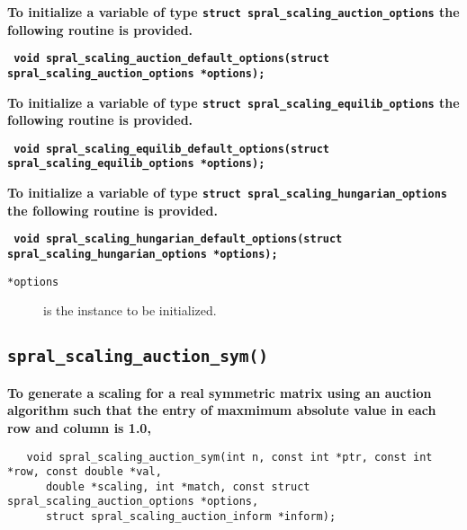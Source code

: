 \textbf{To initialize a variable of type
   \texttt{struct spral\_scaling\_auction\_options} the following routine
   is provided.}

\vspace*{0.1cm}
\noindent
\textbf{\texttt{
   \hspace*{0.3cm} void spral\_scaling\_auction\_default\_options(struct spral\_scaling\_auction\_options *options);
}}

\noindent
\textbf{To initialize a variable of type
   \texttt{struct spral\_scaling\_equilib\_options} the following routine
   is provided.}

\vspace*{0.1cm}
\noindent
\textbf{\texttt{
   \hspace*{0.3cm} void spral\_scaling\_equilib\_default\_options(struct spral\_scaling\_equilib\_options *options);
}}

\noindent
\textbf{To initialize a variable of type
   \texttt{struct spral\_scaling\_hungarian\_options} the following routine
   is provided.}

\vspace*{0.1cm}
\noindent
\textbf{\texttt{
   \hspace*{0.3cm} void spral\_scaling\_hungarian\_default\_options(struct spral\_scaling\_hungarian\_options *options);
}}

\noindent
\begin{description}
   \item[\texttt{*options}] is the instance to be initialized.
\end{description}


\subsection{\texttt{spral\_scaling\_auction\_sym()}}

\textbf{\noindent
   To generate a scaling for a real symmetric matrix using an auction algorithm such that the entry of maxmimum absolute value in each row and column is 1.0,
}
\vspace*{-0.1cm}
\begin{verbatim}
   void spral_scaling_auction_sym(int n, const int *ptr, const int *row, const double *val,
      double *scaling, int *match, const struct spral_scaling_auction_options *options,
      struct spral_scaling_auction_inform *inform);
\end{verbatim}

